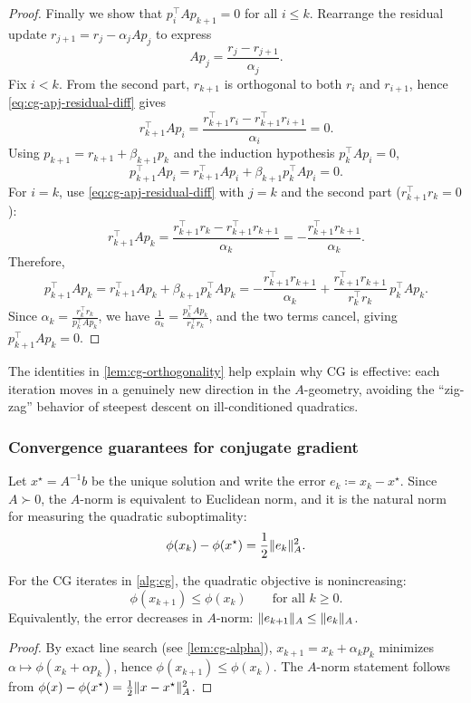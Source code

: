\begin{proof}
Finally we show that $p_i^\top A p_{k+1}=0$ for all $i\le k$.
Rearrange the residual update $r_{j+1}=r_j-\alpha_j A p_j$ to express
\begin{equation}
  A p_j = \frac{r_j-r_{j+1}}{\alpha_j}.
  \label{eq:cg-apj-residual-diff}
\end{equation}
Fix $i<k$.
From the second part, $r_{k+1}$ is orthogonal to both $r_i$ and $r_{i+1}$, hence \eqref{eq:cg-apj-residual-diff} gives
\[
  r_{k+1}^\top A p_i = \frac{r_{k+1}^\top r_i - r_{k+1}^\top r_{i+1}}{\alpha_i} = 0.
\]
Using $p_{k+1}=r_{k+1}+\beta_{k+1}p_k$ and the induction hypothesis $p_k^\top A p_i=0$,
\[
  p_{k+1}^\top A p_i = r_{k+1}^\top A p_i + \beta_{k+1} p_k^\top A p_i = 0.
\]
For $i=k$, use \eqref{eq:cg-apj-residual-diff} with $j=k$ and the second part ($r_{k+1}^\top r_k=0$):
\[
  r_{k+1}^\top A p_k = \frac{r_{k+1}^\top r_k - r_{k+1}^\top r_{k+1}}{\alpha_k}
  = -\frac{r_{k+1}^\top r_{k+1}}{\alpha_k}.
\]
Therefore,
\[
  p_{k+1}^\top A p_k
  = r_{k+1}^\top A p_k + \beta_{k+1} p_k^\top A p_k
  = -\frac{r_{k+1}^\top r_{k+1}}{\alpha_k} + \frac{r_{k+1}^\top r_{k+1}}{r_k^\top r_k}\,p_k^\top A p_k.
\]
Since $\alpha_k = \frac{r_k^\top r_k}{p_k^\top A p_k}$, we have $\frac{1}{\alpha_k}=\frac{p_k^\top A p_k}{r_k^\top r_k}$, and the two terms cancel, giving $p_{k+1}^\top A p_k=0$.
\end{proof}

The identities in \cref{lem:cg-orthogonality} help explain why CG is effective: each iteration moves in a genuinely new direction in the $A$-geometry, avoiding the ``zig-zag'' behavior of steepest descent on ill-conditioned quadratics.

\subsubsection{Convergence guarantees for conjugate gradient}
\label{subsubsec:cg-convergence}

Let $x^\star = A^{-1}b$ be the unique solution and write the error $e_k \coloneqq x_k-x^\star$.
Since $A\succ 0$, the $A$-norm is equivalent to Euclidean norm, and it is the natural norm for measuring the quadratic suboptimality:
\[
  \phi(x_k)-\phi(x^\star)=\frac12 \lVert e_k\rVert_A^2.
\]

\begin{corollary}
\label{cor:cg-monotone}
For the CG iterates in \cref{alg:cg}, the quadratic objective is nonincreasing:
\[
  \phi(x_{k+1}) \le \phi(x_k)
  \qquad \text{for all } k\ge 0.
\]
Equivalently, the error decreases in $A$-norm: $\lVert e_{k+1}\rVert_A \le \lVert e_k\rVert_A$.
\end{corollary}
\begin{proof}
By exact line search (see \cref{lem:cg-alpha}), $x_{k+1}=x_k+\alpha_k p_k$ minimizes $\alpha\mapsto \phi(x_k+\alpha p_k)$, hence $\phi(x_{k+1})\le \phi(x_k)$.
The $A$-norm statement follows from $\phi(x)-\phi(x^\star)=\tfrac12\lVert x-x^\star\rVert_A^2$.
\end{proof}

